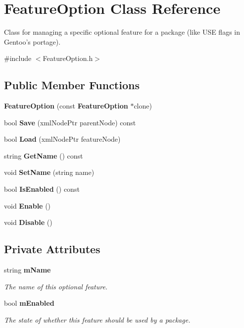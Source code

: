 \section{FeatureOption Class Reference}
\label{classFeatureOption}


Class for managing a specific optional feature for a package (like USE flags in Gentoo's portage).  




{\ttfamily \#include $<$FeatureOption.h$>$}

\subsection*{Public Member Functions}
\begin{DoxyCompactItemize}
\item 
{\bf FeatureOption} (const {\bf FeatureOption} $\ast$clone)
\item 
bool {\bf Save} (xmlNodePtr parentNode) const 
\item 
bool {\bf Load} (xmlNodePtr featureNode)
\item 
string {\bf GetName} () const 
\item 
void {\bf SetName} (string name)
\item 
bool {\bf IsEnabled} () const 
\item 
void {\bf Enable} ()
\item 
void {\bf Disable} ()
\end{DoxyCompactItemize}
\subsection*{Private Attributes}
\begin{DoxyCompactItemize}
\item 
string {\bf mName}\label{classFeatureOption_aecab936d2ed4e3a196563f6ac7522397}

\begin{DoxyCompactList}\small\item\em The name of this optional feature. \item\end{DoxyCompactList}\item 
bool {\bf mEnabled}\label{classFeatureOption_a65ccbe27ec934d2c95ec805395ddae73}

\begin{DoxyCompactList}\small\item\em The state of whether this feature should be used by a package. \item\end{DoxyCompactList}\end{DoxyCompactItemize}



